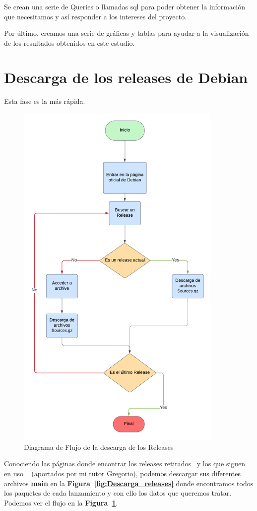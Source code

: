 \documentclass[a4paper, 12pt]{book}
\begin{document}
Se crean una serie de Queries o llamadas sql para poder obtener la información que necesitamos y así responder a los intereses del proyecto.

Por último, creamos una serie de gráficas y tablas para ayudar a la visualización de los resultados obtenidos en este estudio.


\section{Descarga de los releases de Debian} 
\label{sec:Descarga_de_los_releases_de_Debian}

Esta fase es la más rápida. 
\begin{figure}
	\centering
	\includegraphics[width=10cm, keepaspectratio]{img/Descarga Releases.png}
	\caption{Diagrama de Flujo de la descarga de los Releases}
	\label{fig:flow_descarga}
\end{figure}
Conociendo las páginas donde encontrar los releases retirados~\cite{debian:_releases_archive} y los que siguen en uso ~\cite{debian:_releases} (aportados por mi tutor Gregorio), podemos descargar sus diferentes archivos \textbf{main} en la \textbf{Figura~\ref{fig:Descarga_releases}} donde encontramos todos los paquetes de cada lanzamiento y con ello los datos que queremos tratar. Podemos ver el flujo en la \textbf{Figura~\ref{fig:flow_descarga}}.
\end{document}
